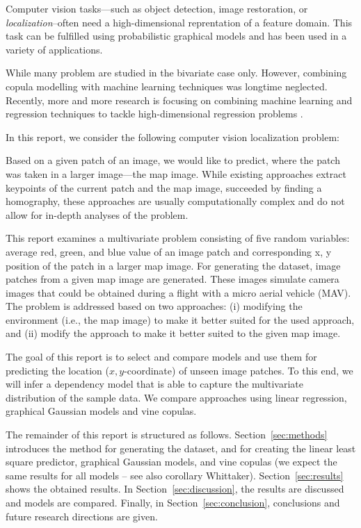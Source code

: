 \documentclass{article}
\begin{document}
Computer vision tasks---such as object detection, image restoration,
or \emph{localization}--often need a high-dimensional reprentation of
a feature domain. This task can be fulfilled using probabilistic
graphical models and has been used in a variety of applications.

While many problem are studied in the bivariate case only.  However,
combining copula modelling with machine learning techniques was
longtime neglected. Recently, more and more research is focusing on
combining machine learning and regression techniques to tackle
high-dimensional regression problems
\cite{cooke2015vine,elidan2013copulas}.

In this report, we consider the following computer vision localization
problem:

Based on a given patch of an image, we would like to predict, where
the patch was taken in a larger image---the map image. While existing
approaches extract keypoints of the current patch and the map image,
succeeded by finding a homography, these approaches are usually
computationally complex and do not allow for in-depth analyses of the
problem.

This report examines a multivariate problem consisting of five random
variables: average red, green, and blue value of an image patch and
corresponding x, y position of the patch in a larger map image. For
generating the dataset, image patches from a given map image are
generated. These images simulate camera images that could be obtained
during a flight with a micro aerial vehicle (MAV). The problem is
addressed based on two approaches: (i) modifying the environment
(i.e., the map image) to make it better suited for the used approach,
and (ii) modify the approach to make it better suited to the given map
image.

The goal of this report is to select and compare models and use them
for predicting the location ($x,y$-coordinate) of unseen image
patches. To this end, we will infer a dependency model that is able to
capture the multivariate distribution of the sample data. We compare
approaches using linear regression, graphical Gaussian models and vine
copulas.


The remainder of this report is structured as
follows. Section~\ref{sec:methods} introduces the method for
generating the dataset, and for creating the linear least square
predictor, graphical Gaussian models, and vine copulas (we expect the
same results for all models -- see also corollary
Whittaker). Section~\ref{sec:results} shows the obtained results. In
Section~\ref{sec:discussion}, the results are discussed and models are
compared. Finally, in Section~\ref{sec:conclusion}, conclusions and
future research directions are given.
\end{document}
